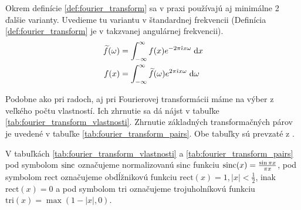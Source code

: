 Okrem definície \ref{def:fourier_transform} sa v praxi používajú aj
minimálne 2 ďalšie varianty. Uvedieme tu variantu v štandardnej
frekvencii (Definícia \ref{def:fourier_transform} je v takzvanej
angulárnej frekvencii).
\begin{align*}
    \widetilde{f}(\omega) &= \int_{-\infty}^{\infty} f(x) e^{-2\pi\hat{\imath} x \omega} \; \mathrm{d} x\\
    f(x) &= \int_{-\infty}^{\infty} \widetilde{f}(\omega) e^{2\pi\hat{\imath} x \omega} \; \mathrm{d}
    \omega
\end{align*}

Podobne ako pri radoch, aj pri Fourierovej transformácii máme na výber
z veľkého počtu vlastností. Ich zhrnutie sa dá nájst v tabuľke
\ref{tab:fourier_transform_vlastnosti}. Zhrnutie základných
transformačných párov je uvedené v tabuľke
\ref{tab:fourier_transform_pairs}. Obe tabuľky sú prevzaté z
\cite{wiki:fourier_transform}.
\begin{poznamka}
    V tabuľkách \ref{tab:fourier_transform_vlastnosti} a 
    \ref{tab:fourier_transform_pairs} pod symbolom $\operatorname{sinc}$ označujeme
    normalizovanú sinc funkciu $\operatorname{sinc}(x) = \frac{\sin \pi x}{\pi x}$,
    pod symbolom $\text{rect}$ označujeme obdĺžnikovú funkciu
    $\text{rect}(x) = 1, |x|<\frac{1}{2}$, inak $\text{rect}(x)=0$
    a pod symbolom $\text{tri}$ označujeme trojuholníkovú funkciu \
    $\text{tri}(x)=\max(1-|x|,0)$.
\end{poznamka}

